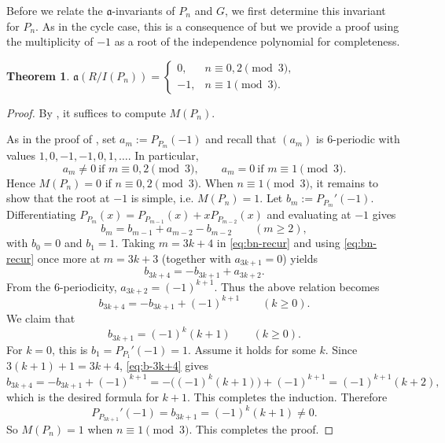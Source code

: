 \documentclass[12pt]{amsart}
\theoremstyle{plain}
\newtheorem{thm}{Theorem}[section]
\theoremstyle{definition}
\begin{document}
Before we relate the $\mathfrak a$-invariants of $P_n$ and $G$, we first determine this invariant for $P_n$. As in the cycle case, this is a consequence of \cite[Theorem 4.5]{biermann2024degree} but we provide a proof using the multiplicity of $-1$ as a root of the independence polynomial for completeness.

\begin{thm}\label{cor:only_path_a_inv}
$
\mathfrak a (R/I(P_n))= 
\begin{cases}
 0, & n\equiv 0,2\pmod 3,\\
 -1, & n\equiv 1\pmod 3.
\end{cases}
$
\end{thm}

\begin{proof}
By  , it suffices to compute $M(P_n)$. 

As in the proof of , set \(a_m:=P_{P_m} (-1)\) and recall that \((a_m)\) is \(6\)-periodic with values \(1,0,-1,-1,0,1,\ldots\). In particular,
\[
a_m\neq 0 \ \text{if } m\equiv 0,2 \pmod 3,
\qquad
a_m=0 \ \text{if } m\equiv 1 \pmod 3.
\]
Hence \(M(P_n)=0\) if \(n\equiv 0,2\pmod 3\). When \(n\equiv 1\pmod 3\), it remains to show that the root at \(-1\) is simple, i.e. $M(P_n)=1$.   Let \(b_m:=P_{P_m}'(-1)\). Differentiating \(P_{P_m} (x)=P_{P_{m-1}}(x)+x P_{P_{m-2}}(x)\) and evaluating at \(-1\) gives
\begin{equation}\label{eq:bn-recur}
b_m=b_{m-1}+a_{m-2}-b_{m-2}\qquad (m\ge 2),
\end{equation}
with \(b_0=0\) and \(b_1=1\). Taking \(m=3k+4\) in \eqref{eq:bn-recur} and using \eqref{eq:bn-recur} once more at
\(m=3k+3\) (together with \(a_{3k+1}=0\)) yields
\[
b_{3k+4}=- b_{3k+1}+a_{3k+2}.
\]
From the \(6\)-periodicity, \(a_{3k+2}=(-1)^{k+1}\). Thus the above relation
becomes
\begin{equation}\label{eq:b-3k+4}
b_{3k+4}=- b_{3k+1}+(-1)^{k+1}\qquad (k\ge 0).
\end{equation}
We claim that
\[
b_{3k+1}=(-1)^k(k+1)\qquad (k\ge 0).
\]
For \(k=0\), this is \(b_1=P_{P_1}'(-1)=1\). Assume it holds for some \(k\). Since \(3(k+1)+1=3k+4\),
\eqref{eq:b-3k+4} gives
\[
b_{3k+4}=- b_{3k+1}+(-1)^{k+1}
=- \bigl((-1)^k(k+1)\bigr)+(-1)^{k+1}=(-1)^{k+1}(k+2),
\]
which is the desired formula for \(k+1\). This completes the induction. Therefore
\[
P_{P_{3k+1}}'(-1)=b_{3k+1}=(-1)^k(k+1)\neq 0.
\]
So \(M(P_n)=1\) when \(n\equiv 1\pmod 3\). This completes the proof.
\end{proof}
\end{document}
